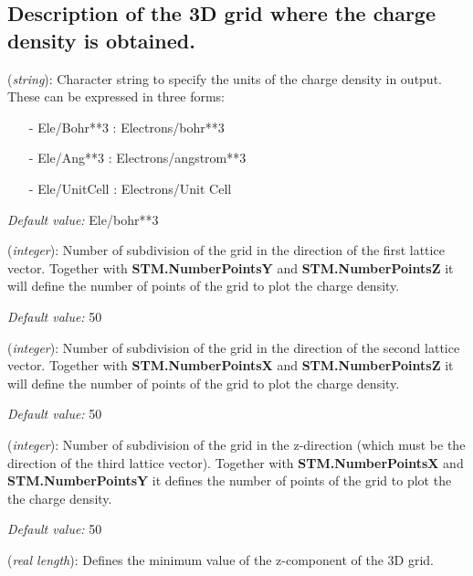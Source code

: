 \vspace{5pt}
\subsection{Description of the 3D grid where the charge density is obtained.}

\begin{description}
\itemsep 10pt
\parsep 0pt

\item[{\bf STM.DensityUnits}] ({\it string}): 
Character string to specify the units of the charge density in output. 
These can be expressed in three forms:

\begin{itemize}
\item[-] Ele/Bohr**3      : Electrons/bohr**3
\item[-] Ele/Ang**3       : Electrons/angstrom**3
\item[-] Ele/UnitCell     : Electrons/Unit Cell 
\end{itemize}

{\it Default value:} Ele/bohr**3

\item[{\bf STM.NumberPointsX}] ({\it integer}):
 Number of subdivision of the grid in the direction of the 
 first lattice vector. Together
 with {\bf STM.NumberPointsY} and {\bf STM.NumberPointsZ}
 it will define the 
 number of points of the grid to plot the charge density.

{\it Default value:} 50

\item[{\bf STM.NumberPointsY}] ({\it integer}):
 Number of subdivision of the grid in the direction
 of the second lattice vector. Together
 with {\bf STM.NumberPointsX} and {\bf STM.NumberPointsZ}
 it will define the 
 number of points of the grid to plot the charge density.

{\it Default value:} 50

\item[{\bf STM.NumberPointsZ}] ({\it integer}):
 Number of subdivision of the grid in the z-direction (which must be the
 direction of the third lattice vector). Together
 with {\bf STM.NumberPointsX} and {\bf STM.NumberPointsY}
 it defines the 
 number of points of the grid to plot the the charge density.

{\it Default value:} 50


\item[{\bf STM.MinZ}] ({\it real length}):
 Defines the minimum value of the z-component of the 3D grid.


\end{description}

